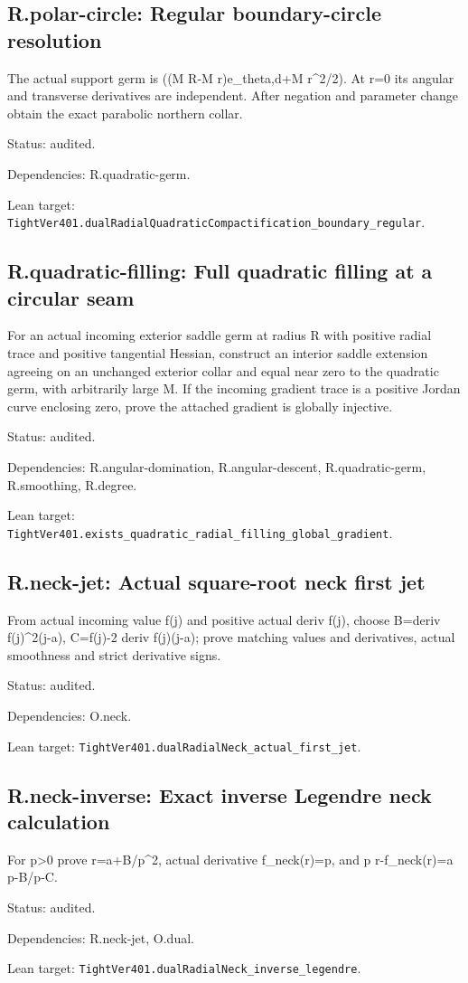 \documentclass{article}
\begin{document}
\subsection*{R.polar-circle: Regular boundary-circle resolution}
The actual support germ is ((M R-M r)e\_theta,d+M r^2/2). At r=0 its angular and transverse derivatives are independent. After negation and parameter change obtain the exact parabolic northern collar.
\par Status: audited.
\par Dependencies: R.quadratic-germ.
\par Lean target: \texttt{TightVer401.dualRadialQuadraticCompactification\_boundary\_regular}.
\subsection*{R.quadratic-filling: Full quadratic filling at a circular seam}
For an actual incoming exterior saddle germ at radius R with positive radial trace and positive tangential Hessian, construct an interior saddle extension agreeing on an unchanged exterior collar and equal near zero to the quadratic germ, with arbitrarily large M. If the incoming gradient trace is a positive Jordan curve enclosing zero, prove the attached gradient is globally injective.
\par Status: audited.
\par Dependencies: R.angular-domination, R.angular-descent, R.quadratic-germ, R.smoothing, R.degree.
\par Lean target: \texttt{TightVer401.exists\_quadratic\_radial\_filling\_global\_gradient}.
\subsection*{R.neck-jet: Actual square-root neck first jet}
From actual incoming value f(j) and positive actual deriv f(j), choose B=deriv f(j)^2(j-a), C=f(j)-2 deriv f(j)(j-a); prove matching values and derivatives, actual smoothness and strict derivative signs.
\par Status: audited.
\par Dependencies: O.neck.
\par Lean target: \texttt{TightVer401.dualRadialNeck\_actual\_first\_jet}.
\subsection*{R.neck-inverse: Exact inverse Legendre neck calculation}
For p>0 prove r=a+B/p^2, actual derivative f\_neck(r)=p, and p r-f\_neck(r)=a p-B/p-C.
\par Status: audited.
\par Dependencies: R.neck-jet, O.dual.
\par Lean target: \texttt{TightVer401.dualRadialNeck\_inverse\_legendre}.
\end{document}
